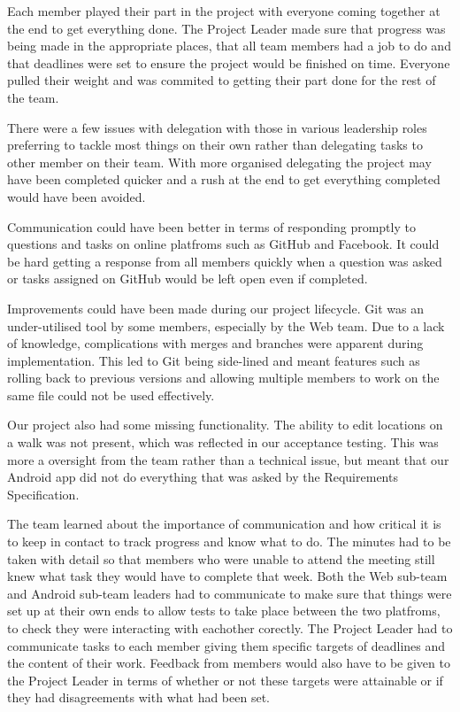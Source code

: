 \documentclass{project}
\begin{document}
Each member played their part in the project with everyone coming together at the end to get everything done. The Project Leader made sure that progress was being made in the appropriate places, that all team members had a job to do and that deadlines were set to ensure the project would be finished on time. Everyone pulled their weight and was commited to getting their part done for the rest of the team.

There were a few issues with delegation with those in various leadership roles preferring to tackle most things on their own rather than delegating tasks to other member on their team. With more organised delegating the project may have been completed quicker and a rush at the end to get everything completed would have been avoided.

Communication could have been better in terms of responding promptly to questions and tasks on online platfroms such as GitHub and Facebook. It could be hard getting a response from all members quickly when a question was asked or tasks assigned on GitHub would be left open even if completed.

Improvements could have been made during our project lifecycle. Git was an under-utilised tool by some members, especially by the Web team. Due to a lack of knowledge, complications with merges and branches were apparent during implementation. This led to Git being side-lined and meant features such as rolling back to previous versions and allowing multiple members to work on the same file could not be used effectively.

Our project also had some missing functionality. The ability to edit locations on a walk was not present, which was reflected in our acceptance testing. This was more a oversight from the team rather than a technical issue, but meant that our Android app did not do everything that was asked by the Requirements Specification. 

The team learned about the importance of communication and how critical it is to keep in contact to track progress and know what to do. The minutes had to be taken with detail so that members who were unable to attend the meeting still knew what task they would have to complete that week. Both the Web sub-team and Android sub-team leaders had to communicate to make sure that things were set up at their own ends to allow tests to take place between the two platfroms, to check they were interacting with eachother corectly. The Project Leader had to communicate tasks to each member giving them specific targets of deadlines and the content of their work. Feedback from members would also have to be given to the Project Leader in terms of whether or not these targets were attainable or if they had disagreements with what had been set.
\end{document}
